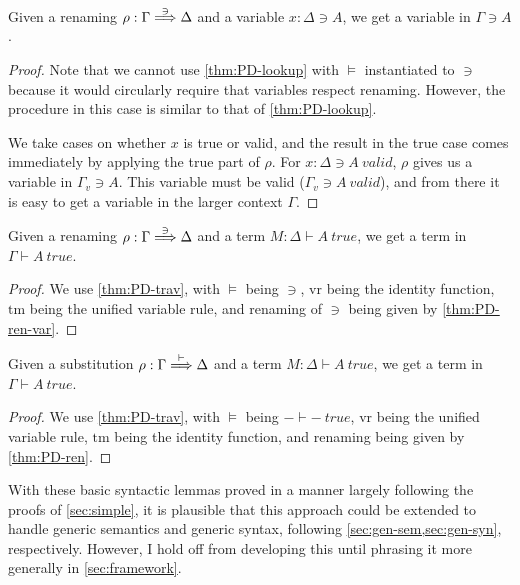\begin{lemma}\label{thm:PD-ren-var}
  Given a renaming $\rho : \Gamma \stackrel{\ni}\Longrightarrow \Delta$ and a variable
  $x : \Delta \ni A$, we get a variable in $\Gamma \ni A$.
\end{lemma}
\begin{proof}
  Note that we cannot use \cref{thm:PD-lookup} with $\vDash$ instantiated to
  $\ni$ because it would circularly require that variables respect renaming.
  However, the procedure in this case is similar to that of
  \cref{thm:PD-lookup}.

  We take cases on whether $x$ is true or valid, and the result in the true case
  comes immediately by applying the true part of $\rho$.
  For $x : \Delta \ni A~\mathit{valid}$, $\rho$ gives us a variable in
  $\Gamma_v \ni A$.
  This variable must be valid ($\Gamma_v \ni A~\mathit{valid}$), and from there
  it is easy to get a variable in the larger context $\Gamma$.
\end{proof}

\begin{corollary}[renaming]\label{thm:PD-ren}
  Given a renaming $\rho : \Gamma \stackrel{\ni}\Longrightarrow \Delta$ and a term
  $M : \Delta \vdash A~\mathit{true}$, we get a term in
  $\Gamma \vdash A~\mathit{true}$.
\end{corollary}
\begin{proof}
  We use \cref{thm:PD-trav}, with $\vDash$ being $\ni$, $\mathrm{vr}$ being the
  identity function, $\mathrm{tm}$ being the unified variable rule, and renaming
  of $\ni$ being given by \cref{thm:PD-ren-var}.
\end{proof}

\begin{corollary}[substitution]\label{thm:PD-sub}
  Given a substitution $\rho : \Gamma \stackrel{\vdash}\Longrightarrow \Delta$ and a term
  $M : \Delta \vdash A~\mathit{true}$, we get a term in
  $\Gamma \vdash A~\mathit{true}$.
\end{corollary}
\begin{proof}
  We use \cref{thm:PD-trav}, with $\vDash$ being $- \vdash -~\mathit{true}$,
  $\mathrm{vr}$ being the unified variable rule, $\mathrm{tm}$ being the
  identity function, and renaming being given by \cref{thm:PD-ren}.
\end{proof}

With these basic syntactic lemmas proved in a manner largely following the
proofs of \cref{sec:simple}, it is plausible that this approach could be
extended to handle generic semantics and generic syntax, following
\cref{sec:gen-sem,sec:gen-syn}, respectively.
However, I hold off from developing this until phrasing it more generally in
\cref{sec:framework}.
